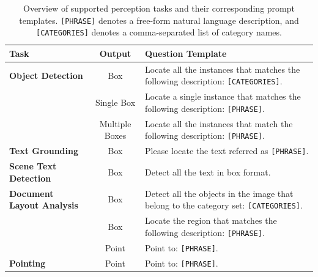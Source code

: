 
\begin{table}[H]
\centering
\vspace{+2mm}
\caption{Overview of supported perception tasks and their corresponding prompt templates. \texttt{[PHRASE]} denotes a free-form natural language description, and \texttt{[CATEGORIES]} denotes a comma-separated list of category names.}
\label{tab:task_prompts}
\renewcommand{\arraystretch}{1.3}
\setlength{\tabcolsep}{6pt}
\small

\renewcommand{\tabularxcolumn}[1]{m{#1}}
\begin{tabularx}{\linewidth}{>{\raggedright\arraybackslash}m{3.2cm} c >{\raggedright\arraybackslash}X}
\arrayrulecolor{nvgreen}
\toprule
\rowcolor{nvheader}
\textcolor{nvwhite}{\textbf{Task}} & \textcolor{nvwhite}{\textbf{Output}} & \textcolor{nvwhite}{\textbf{Question Template}} \\
\midrule

\rowcolor{nvlightgreen}
\textbf{Object Detection} & Box & Locate all the instances that matches the following description:  \texttt{[CATEGORIES]}. \\
\midrule\noalign{\vspace{3pt}}

\rowcolor{nvwhite}
 & Single Box & Locate a single instance that matches the following description: \texttt{[PHRASE]}. \\

\rowcolor{nvwhite}
\multirow{-2}{3.2cm}{\textbf{Phrase Grounding}} & Multiple Boxes & Locate all the instances that match the following description: \texttt{[PHRASE]}. \\
\midrule

\rowcolor{nvlightgreen}
\textbf{Text Grounding} & Box & Please locate the text referred as \texttt{[PHRASE]}. \\
\midrule

\rowcolor{nvwhite}
\textbf{Scene Text Detection} & Box & Detect all the text in box format. \\
\midrule

\rowcolor{nvlightgreen}
\textbf{Document Layout Analysis} & Box & Detect all the objects in the image that belong to the category set: \texttt{[CATEGORIES]}. \\
\midrule\noalign{\vspace{3pt}}

\rowcolor{nvwhite}
 & Box & Locate the region that matches the following description: \texttt{[PHRASE]}. \\
\rowcolor{nvwhite}
\multirow{-2}{3.2cm}{\textbf{GUI Grounding}} & Point & Point to: \texttt{[PHRASE]}. \\
\midrule

\rowcolor{nvlightgreen}
\textbf{Pointing} & Point & Point to: \texttt{[PHRASE]}. \\
\bottomrule

\end{tabularx}
\end{table}